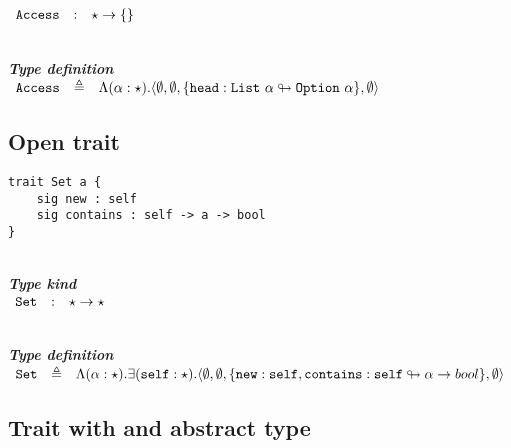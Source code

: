 \documentclass{article}[11pt]
\newcommand{\subsubsubsection}[1]
{
    ~\\
    {\bf {\em #1}} \\
}
\newcommand{\term}[1]{\verb~#1~}
\begin{document}
    \noindent
    \begin{math}
        \begin{array}{rclp{5cm}}
            \term{Access}  & : & \star \rightarrow  \{\}
        \end{array}
    \end{math}

    \subsubsubsection{Type definition}

    \noindent
    \begin{math}
        \begin{array}{rclp{5cm}}
            \term{Access} & \triangleq & \Lambda(\alpha:\star).\langle
            \emptyset,
            \emptyset,
            \{ \term{head} : \term{List}~\alpha \looparrowright \term{Option}~\alpha \},
            \emptyset
            \rangle
        \end{array}
    \end{math}

    \subsection{Open trait}

    \begin{verbatim}
trait Set a {
    sig new : self
    sig contains : self -> a -> bool
}
    \end{verbatim}

    \subsubsubsection{Type kind}

    \noindent
    \begin{math}
        \begin{array}{rclp{5cm}}
            \term{Set}  & : & \star \rightarrow \star
        \end{array}
    \end{math}

    \subsubsubsection{Type definition}

    \noindent
    \begin{math}
        \begin{array}{rclp{5cm}}
            \term{Set} & \triangleq & \Lambda(\alpha:\star).\exists(\term{self}:\star).\langle
            \emptyset,
            \emptyset,
            \{ \term{new} : \term{self}, \term{contains} : \term{self} \looparrowright \alpha \rightarrow bool \},
            \emptyset
            \rangle
        \end{array}
    \end{math}

    \subsection{Trait with and abstract type}\label{subsec:trait-with-and-abstract-type}
\end{document}
